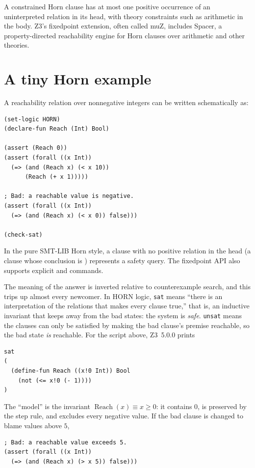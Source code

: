 \documentclass[10pt,letterpaper,oneside]{report}
\newcommand{\code}[1]{\texttt{\detokenize{#1}}}
\newcommand{\sat}{\texttt{sat}}
\newcommand{\unsat}{\texttt{unsat}}
\begin{document}
A constrained Horn clause has at most one positive occurrence of an uninterpreted relation in its head, with theory constraints such as arithmetic in the body. Z3's fixedpoint extension, often called muZ, includes Spacer, a property-directed reachability engine for Horn clauses over arithmetic and other theories.

\section{A tiny Horn example}

A reachability relation over nonnegative integers can be written schematically as:

\begin{lstlisting}[language=SMTLib]
(set-logic HORN)
(declare-fun Reach (Int) Bool)

(assert (Reach 0))
(assert (forall ((x Int))
  (=> (and (Reach x) (< x 10))
      (Reach (+ x 1)))))

; Bad: a reachable value is negative.
(assert (forall ((x Int))
  (=> (and (Reach x) (< x 0)) false)))

(check-sat)
\end{lstlisting}

In the pure SMT-LIB Horn style, a clause with no positive relation in the head (a clause whose conclusion is \code{false}) represents a safety query. The fixedpoint API also supports explicit \code{rule} and \code{query} commands.

The meaning of the answer is inverted relative to counterexample search, and this trips up almost every newcomer. In \textsf{HORN} logic, \sat{} means ``there is an interpretation of the relations that makes every clause true,'' that is, an inductive invariant that keeps \code{Reach} away from the bad states: the system is \emph{safe}. \unsat{} means the clauses can only be satisfied by making the bad clause's premise reachable, so the bad state \emph{is} reachable. For the script above, Z3~5.0.0 prints

\begin{lstlisting}[language=SMTLib]
sat
(
  (define-fun Reach ((x!0 Int)) Bool
    (not (<= x!0 (- 1))))
)
\end{lstlisting}

The ``model'' is the invariant $\operatorname{Reach}(x)\equiv x\ge 0$: it contains $0$, is preserved by the step rule, and excludes every negative value. If the bad clause is changed to blame values above $5$,

\begin{lstlisting}[language=SMTLib]
; Bad: a reachable value exceeds 5.
(assert (forall ((x Int))
  (=> (and (Reach x) (> x 5)) false)))
\end{lstlisting}
\end{document}
